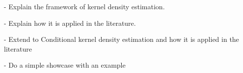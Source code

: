 - Explain the framework of kernel density estimation.

- Explain how it is applied in the literature.

- Extend to Conditional kernel density estimation
and how it is applied in the literature

- Do a simple showcase with an example
